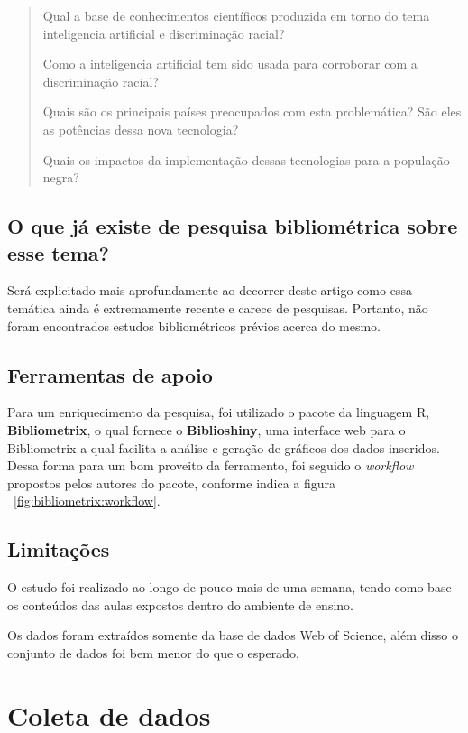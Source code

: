 \begin{quote}

Qual a base de conhecimentos científicos produzida em torno do tema inteligencia artificial e discriminação racial?

Como a inteligencia artificial tem sido usada para corroborar com a discriminação racial? 

Quais são os principais países preocupados com esta problemática?  São eles as potências dessa nova tecnologia?

Quais os impactos da implementação dessas tecnologias para a população negra?

\end{quote}


\subsection{O que já existe de pesquisa bibliométrica sobre esse tema?}

Será explicitado mais aprofundamente ao decorrer deste artigo como essa temática ainda é extremamente recente e carece de pesquisas. Portanto, não foram encontrados estudos bibliométricos prévios acerca do mesmo.

\subsection{Ferramentas de apoio}

Para um enriquecimento da pesquisa, foi utilizado o pacote da linguagem R, \textbf{Bibliometrix}, o qual fornece o \textbf{Biblioshiny}, uma interface web para o Bibliometrix a qual facilita a análise e geração de gráficos dos dados inseridos. Dessa forma para um bom proveito da ferramento, foi seguido o \textit{workflow} propostos pelos autores do pacote, conforme indica a figura ~\ref{fig:bibliometrix:workflow}.

\subsection{Limitações} 
O estudo foi realizado ao longo de pouco mais de uma semana, tendo como base os conteúdos das aulas expostos dentro do ambiente de ensino. 

Os dados foram extraídos somente da base de dados Web of Science, além disso o conjunto de dados foi bem menor do que o esperado.

\section{Coleta de dados}


